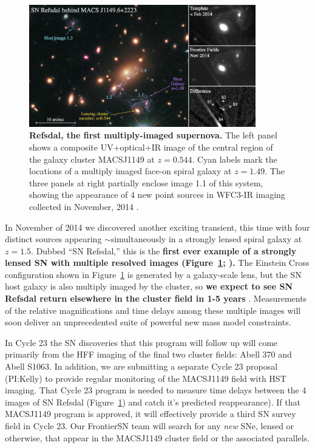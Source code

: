 \documentclass[12pt]{article}
\begin{document}
\begin{figure}
\begin{center}
{}
\vspace{3mm}
\includegraphics[width=0.88\textwidth]{FIG/refsdal_discovery.jpg}
 \caption{ %
  {\bf Refsdal, the first multiply-imaged supernova.}
   The left panel shows a composite UV+optical+IR image of the central
   region of the galaxy cluster MACSJ1149 at $z=0.544$.  Cyan labels
   mark the locations of a multiply imaged face-on spiral galaxy at
   $z=1.49$.  The three panels at
   right partially enclose image 1.1 of this system, showing the
   appearance of 4 new point sources in WFC3-IR imaging collected in
   November, 2014 \citep{Kelly:2015}.
\label{fig:refsdal}  }
\end{center}
\end{figure}

In November of 2014 we discovered another exciting transient, this
time with four distinct sources appearing $\sim$simultaneously in a
strongly lensed spiral galaxy at $z=1.5$.  Dubbed ``SN Refsdal,'' this
is the {\bf first ever example of a strongly lensed SN with multiple
  resolved images (Figure~\ref{fig:refsdal}; \citealt{Kelly:2015}).}
The Einstein Cross configuration shown in Figure~\ref{fig:refsdal} is
generated by a galaxy-scale lens, but the SN host galaxy is also
multiply imaged by the cluster, so {\bf we expect to see SN Refsdal
  return elsewhere in the cluster field in 1-5 years}
\citep{Oguri:2015,Sharon:2015}.  Measurements of the relative
magnifications and time delays among these multiple images will soon
deliver an unprecedented suite of powerful new mass model constraints.



%
%
\describeobservations   %

In Cycle 23 the SN discoveries that this program will follow up will
come primarily from the HFF imaging of the final two cluster fields:
Abell 370 and Abell S1063. In addition, we are submitting a separate
Cycle 23 proposal (PI:Kelly) to provide regular monitoring of the
MACSJ1149 field with HST imaging.  That Cycle 23 program is needed to
measure time delays between the 4 images of SN Refsdal
(Figure~\ref{fig:refsdal}) and catch it's predicted reappearance).  If
that MACSJ1149 program is approved, it will effectively provide a
third SN survey field in Cycle 23. Our FrontierSN team will search
for any {\it new} SNe, lensed or otherwise, that appear in the
MACSJ1149 cluster field or the associated parallels.
\end{document}
